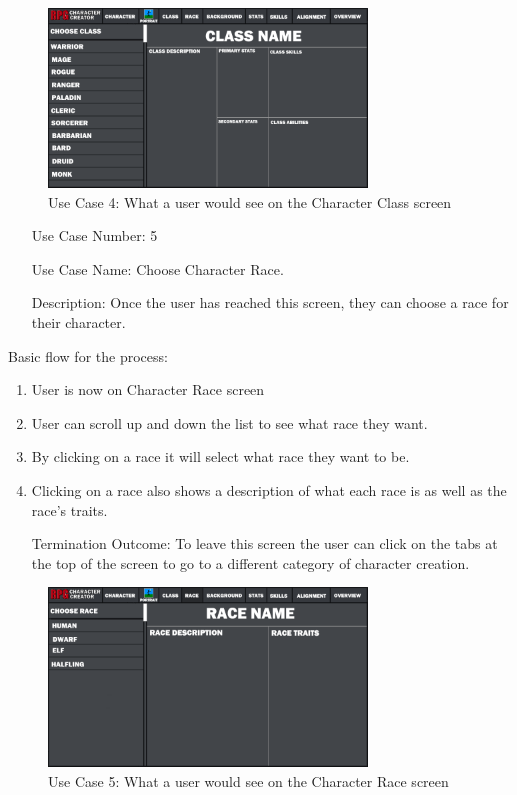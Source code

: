 \documentclass[10pt,conference,onecolumn,compsoc]{IEEEtran}
\begin{document}
\begin{figure}[ht!]
\includegraphics[height=180px, width=320px]{CSCI 352 Interface Mockups/Interface Mockup 2.png}
\caption{Use Case 4: What a user would see on the Character Class screen}
\centering
\label{mockup2}
\end{figure}

\begin{itemize}
\item[Use Case Number:] 5
\item[Use Case Name:] Choose Character Race.
\item[Description:] Once the user has reached this screen, they can choose a race for their character.
\end{itemize}
Basic flow for the process:
\begin{enumerate}
\item User is now on Character Race screen
\item User can scroll up and down the list to see what race they want.
\item By clicking on a race it will select what race they want to be.
\item Clicking on a race also shows a description of what each race is as well as the race's traits.
\item[Termination Outcome:] To leave this screen the user can click on the tabs at the top of the screen to go to a different category of character creation.
\end{enumerate}

\begin{figure}[H]
\includegraphics[height=180px, width=320px]{CSCI 352 Interface Mockups/Interface Mockup 3.png}
\caption{Use Case 5: What a user would see on the Character Race screen}
\centering
\label{mockup3}
\end{figure}
\end{document}
